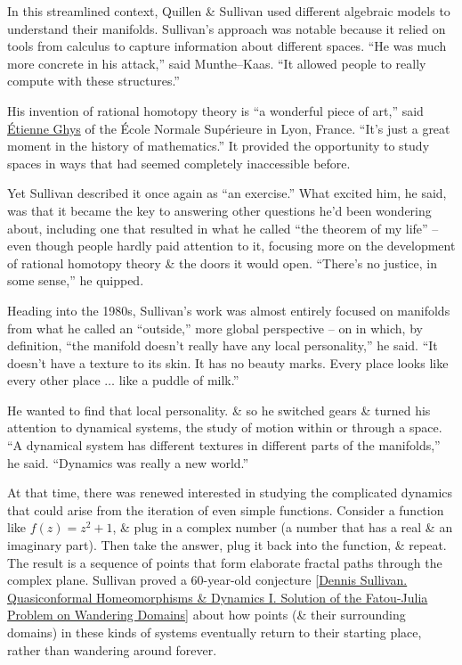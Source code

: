 \documentclass[oneside]{book}
\numberwithin{equation}{section}
\begin{document}
In this streamlined context, Quillen \& Sullivan used different algebraic models to understand their manifolds. Sullivan's approach was notable because it relied on tools from calculus to capture information about different spaces. ``He was much more concrete in his attack,'' said Munthe--Kaas. ``It allowed people to really compute with these structures.''

His invention of rational homotopy theory is ``a wonderful piece of art,'' said \href{https://perso.ens-lyon.fr/ghys/home/}{\'Etienne Ghys} of the \'Ecole Normale Sup\'erieure in Lyon, France. ``It's just a great moment in the history of mathematics.'' It provided the opportunity to study spaces in ways that had seemed completely inaccessible before.

Yet Sullivan described it once again as ``an exercise.'' What excited him, he said, was that it became the key to answering other questions he'd been wondering about, including one that resulted in what he called ``the theorem of my life'' -- even though people hardly paid attention to it, focusing more on the development of rational homotopy theory \& the doors it would open. ``There's no justice, in some sense,'' he quipped.

Heading into the 1980s, Sullivan's work was almost entirely focused on manifolds from what he called an ``outside,'' more global perspective -- on in which, by definition, ``the manifold doesn't really have any local personality,'' he said. ``It doesn't have a texture to its skin. It has no beauty marks. Every place looks like every other place $\ldots$ like a puddle of milk.''

He wanted to find that local personality. \& so he switched gears \& turned his attention to dynamical systems, the study of motion within or through a space. ``A dynamical system has different textures in different parts of the manifolds,'' he said. ``Dynamics was really a new world.''

At that time, there was renewed interested in studying the complicated dynamics that could arise from the iteration of even simple functions. Consider a function like $f(z) = z^2 + 1$, \& plug in a complex number (a number that has a real \& an imaginary part). Then take the answer, plug it back into the function, \& repeat. The result is a sequence of points that form elaborate fractal paths through the complex plane. Sullivan proved a 60-year-old conjecture [\href{https://www.jstor.org/stable/1971308}{Dennis Sullivan. Quasiconformal Homeomorphisms \& Dynamics I. Solution of the Fatou-Julia Problem on Wandering Domains}] about how points (\& their surrounding domains) in these kinds of systems eventually return to their starting place, rather than wandering around forever.
\end{document}
